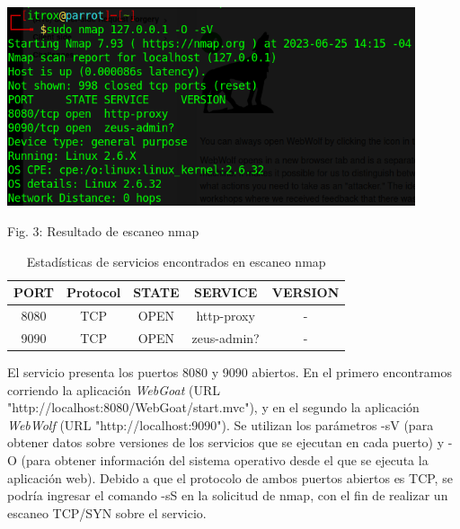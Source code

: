 \documentclass[12pt,oneside,a4paper]{book}
\begin{document}
\begin{enumerate}
\begin{enumerate}
            \vspace{2em}
            
            \begin{center}
                \includegraphics[width=12cm]{img/nmap.png}
                
                \vspace{0.1em}
                
                Fig. 3: Resultado de escaneo nmap
            \end{center}
            
            \vspace{2em}
            
            \begin{table}[H]
                \centering
                \begin{tabular}{|c|c|c|c|c|}
                     \hline %
                     \textbf{PORT} & \textbf{Protocol} & \textbf{STATE} & \textbf{SERVICE} & \textbf{VERSION} \\
                     \hline %
                     8080 & TCP & OPEN & http-proxy & - \\
                     \hline %
                     9090 & TCP & OPEN & zeus-admin? & - \\
                     \hline %
                \end{tabular}
                \caption{Estadísticas de servicios encontrados en escaneo nmap}
                \label{tab:my_label}
            \end{table}
            
            \vspace{1em}
    
            \newline
            \hspace{20pt}
            El servicio presenta los puertos 8080 y 9090 abiertos. En el primero encontramos corriendo la aplicación \textit{WebGoat} (URL "http://localhost:8080/WebGoat/start.mvc"), y en el segundo la aplicación \textit{WebWolf} (URL "http://localhost:9090"). Se utilizan los parámetros -sV (para obtener datos sobre versiones de los servicios que se ejecutan en cada puerto) y -O  (para obtener información del sistema operativo desde el que se ejecuta la aplicación web). Debido a que el protocolo de ambos puertos abiertos es TCP, se podría ingresar el comando -sS en la solicitud de nmap, con el fin de realizar un escaneo TCP/SYN sobre el servicio.
            

\end{enumerate}
\end{enumerate}
\end{document}
